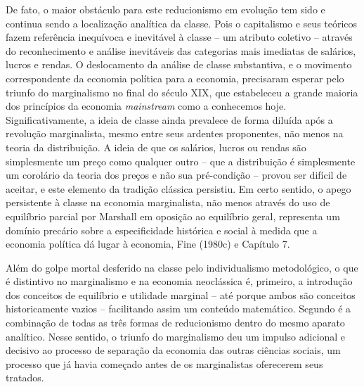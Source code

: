 \documentclass[12pt]{article}
\begin{document}
De fato, o maior obstáculo para este reducionismo em evolução tem sido e continua sendo a localização analítica da classe. Pois o capitalismo e seus teóricos fazem referência inequívoca e inevitável à classe – um atributo coletivo – através do reconhecimento e análise inevitáveis das categorias mais imediatas de salários, lucros e rendas. O deslocamento da análise de classe substantiva, e o movimento correspondente da economia política para a economia, precisaram esperar pelo triunfo do marginalismo no final do século XIX, que estabeleceu a grande maioria dos princípios da economia \textit{mainstream} como a conhecemos hoje. Significativamente, a ideia de classe ainda prevalece de forma diluída após a revolução marginalista, mesmo entre seus ardentes proponentes, não menos na teoria da distribuição. A ideia de que os salários, lucros ou rendas são simplesmente um preço como qualquer outro – que a distribuição é simplesmente um corolário da teoria dos preços e não sua pré-condição – provou ser difícil de aceitar, e este elemento da tradição clássica persistiu. Em certo sentido, o apego persistente à classe na economia marginalista, não menos através do uso de equilíbrio parcial por Marshall em oposição ao equilíbrio geral, representa um domínio precário sobre a especificidade histórica e social à medida que a economia política dá lugar à economia, Fine (1980c) e Capítulo 7.

Além do golpe mortal desferido na classe pelo individualismo metodológico, o que é distintivo no marginalismo e na economia neoclássica é, primeiro, a introdução dos conceitos de equilíbrio e utilidade marginal – até porque ambos são conceitos historicamente vazios – facilitando assim um conteúdo matemático. Segundo é a combinação de todas as três formas de reducionismo dentro do mesmo aparato analítico. Nesse sentido, o triunfo do marginalismo deu um impulso adicional e decisivo ao processo de separação da economia das outras ciências sociais, um processo que já havia começado antes de os marginalistas oferecerem seus tratados.
\end{document}
